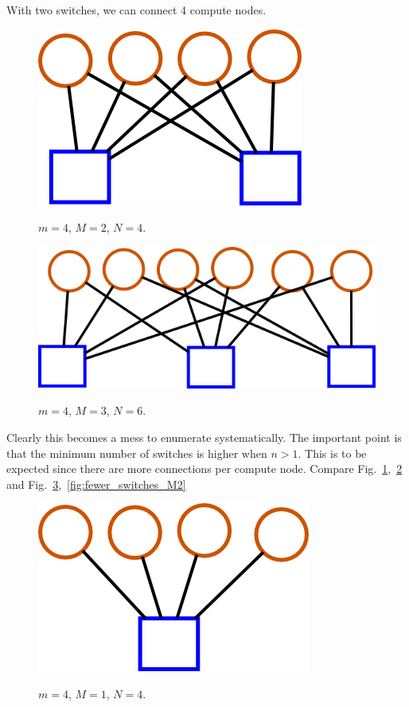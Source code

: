 \documentclass[pdftex]{article}
\begin{document}
With two switches, we can connect 4 compute nodes.

\begin{figure}[h!]
\begin{center}
\includegraphics[scale=0.3]{pictures/N4_n2_M2_m4}
\label{fig:ngt14}
 \caption{$m=4$, $M=2$, $N=4$.}
\end{center}
\end{figure}


\begin{figure}[h!]
\begin{center}
\includegraphics[scale=0.3]{pictures/N6_n2_M3_m4}
\label{fig:ngt16}
 \caption{$m=4$, $M=3$, $N=6$.}
\end{center}
\end{figure}

Clearly this becomes a mess to enumerate systematically. The important point is that the minimum number of switches is higher when $n>1$. This is to be expected since there are more connections per compute node. Compare Fig.~\ref{fig:ngt14},~\ref{fig:ngt16} and Fig.~\ref{fig:fewer_switches_M1},~\ref{fig:fewer_switches_M2}

\begin{figure}[h!]
\begin{center}
\includegraphics[scale=0.3]{pictures/N4_n1_M1_m4}
\label{fig:fewer_switches_M1}
 \caption{$m=4$, $M=1$, $N=4$.}
\end{center}
\end{figure}
\end{document}

